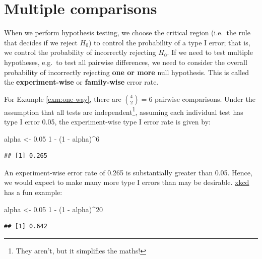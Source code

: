 \documentclass[
]{book}
\newenvironment{Shaded}{\begin{snugshade}}{\end{snugshade}}
\newcommand{\DecValTok}[1]{\textcolor[rgb]{0.00,0.00,0.81}{#1}}
\newcommand{\FloatTok}[1]{\textcolor[rgb]{0.00,0.00,0.81}{#1}}
\newcommand{\NormalTok}[1]{#1}
\newcommand{\OtherTok}[1]{\textcolor[rgb]{0.56,0.35,0.01}{#1}}
\newcommand{\SpecialCharTok}[1]{\textcolor[rgb]{0.00,0.00,0.00}{#1}}
\theoremstyle{definition}
\theoremstyle{definition}
\theoremstyle{definition}
\theoremstyle{definition}
\theoremstyle{remark}
\begin{document}
\hypertarget{multiple-comp}{%
\section{Multiple comparisons}\label{multiple-comp}}

When we perform hypothesis testing, we choose the critical region (i.e.~the rule that decides if we reject \(H_0\)) to control the probability of a type I error; that is, we control the probability of incorrectly rejecting \(H_0\). If we need to test multiple hypotheses, e.g.~to test all pairwise differences, we need to consider the overall probability of incorrectly rejecting \textbf{one or more} null hypothesis. This is called the \textbf{experiment-wise} or \textbf{family-wise} error rate.

For Example \ref{exm:one-way}, there are \({4 \choose 2} = 6\) pairwise comparisons. Under the assumption that all tests are independent\footnote{They aren't, but it simplifies the maths!}, assuming each individual test has type I error 0.05, the experiment-wise type I error rate is given by:

\begin{Shaded}
\begin{Highlighting}[]
\NormalTok{alpha }\OtherTok{\textless{}{-}} \FloatTok{0.05}
\DecValTok{1} \SpecialCharTok{{-}}\NormalTok{ (}\DecValTok{1} \SpecialCharTok{{-}}\NormalTok{ alpha)}\SpecialCharTok{\^{}}\DecValTok{6}
\end{Highlighting}
\end{Shaded}

\begin{verbatim}
## [1] 0.265
\end{verbatim}

An experiment-wise error rate of 0.265 is substantially greater than 0.05. Hence, we would expect to make many more type I errors than may be desirable. \href{https://xkcd.com/882}{xkcd} has a fun example:

\begin{Shaded}
\begin{Highlighting}[]
\NormalTok{alpha }\OtherTok{\textless{}{-}} \FloatTok{0.05}
\DecValTok{1} \SpecialCharTok{{-}}\NormalTok{ (}\DecValTok{1} \SpecialCharTok{{-}}\NormalTok{ alpha)}\SpecialCharTok{\^{}}\DecValTok{20}
\end{Highlighting}
\end{Shaded}

\begin{verbatim}
## [1] 0.642
\end{verbatim}
\end{document}

